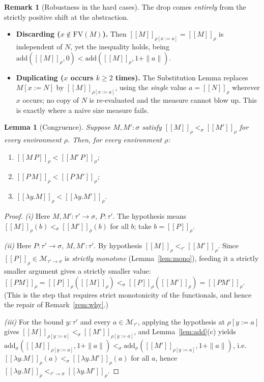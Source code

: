 \documentclass{amsart}
\newtheorem{lemma}{Lemma}
\theoremstyle{definition}
\newtheorem{remark}{Remark}
\newcommand{\interp}[1]{[\![#1]\!]}
\newcommand{\FV}{\mathrm{FV}}
\begin{document}
\begin{remark}[Robustness in the hard cases]
The drop comes \emph{entirely} from the strictly positive shift at the abstraction.
\begin{itemize}
\item \textbf{Discarding ($x\notin\FV(M)$).} Then $\interp{M}_{\rho[x:=a]}=\interp{M}_\rho$
  is independent of $N$, yet the inequality holds, being
  $\mathrm{add}(\interp M_\rho,0)<\mathrm{add}(\interp M_\rho,1+\|a\|)$.
\item \textbf{Duplicating ($x$ occurs $k\ge 2$ times).} The Substitution Lemma replaces
  $M[x:=N]$ by $\interp{M}_{\rho[x:=a]}$, using the \emph{single} value $a=\interp N_\rho$
  wherever $x$ occurs; no copy of $N$ is re-evaluated and the measure cannot blow up. This
  is exactly where a naive size measure fails.
\end{itemize}
\end{remark}

\begin{lemma}[Congruence]\label{lem:cong}
Suppose $M,M':\sigma$ satisfy $\interp{M}_\rho<_\sigma\interp{M'}_\rho$ for every
environment $\rho$. Then, for every environment $\rho$:
\begin{enumerate}
\item[(i)] $\interp{M\,P}_\rho<\interp{M'\,P}_\rho$;
\item[(ii)] $\interp{P\,M}_\rho<\interp{P\,M'}_\rho$;
\item[(iii)] $\interp{\lambda y.M}_\rho<\interp{\lambda y.M'}_\rho$.
\end{enumerate}
\end{lemma}

\begin{proof}
\emph{(i)} Here $M,M':\tau'\to\sigma$, $P:\tau'$. The hypothesis means
$\interp{M}_\rho(b)<_\sigma\interp{M'}_\rho(b)$ for all $b$; take $b=\interp P_\rho$.

\emph{(ii)} Here $P:\tau'\to\sigma$, $M,M':\tau'$. By hypothesis
$\interp{M}_\rho<_{\tau'}\interp{M'}_\rho$. Since $\interp P_\rho\in\mathcal M_{\tau'\to\sigma}$
is \emph{strictly monotone} (Lemma~\ref{lem:mono}), feeding it a strictly smaller argument
gives a strictly smaller value:
$\interp{PM}_\rho=\interp P_\rho(\interp M_\rho)<_\sigma\interp P_\rho(\interp{M'}_\rho)=\interp{PM'}_\rho$.
(This is the step that requires strict monotonicity of the functionals, and hence the
repair of Remark~\ref{rem:why}.)

\emph{(iii)} For the bound $y:\tau'$ and every $a\in\mathcal M_{\tau'}$, applying the
hypothesis at $\rho[y:=a]$ gives $\interp{M}_{\rho[y:=a]}<_\sigma\interp{M'}_{\rho[y:=a]}$,
and Lemma~\ref{lem:add}(c) yields
$\mathrm{add}_\sigma(\interp{M}_{\rho[y:=a]},1+\|a\|)<_\sigma\mathrm{add}_\sigma(\interp{M'}_{\rho[y:=a]},1+\|a\|)$,
i.e. $\interp{\lambda y.M}_\rho(a)<_\sigma\interp{\lambda y.M'}_\rho(a)$ for all $a$, hence
$\interp{\lambda y.M}_\rho<_{\tau'\to\sigma}\interp{\lambda y.M'}_\rho$.
\end{proof}
\end{document}
